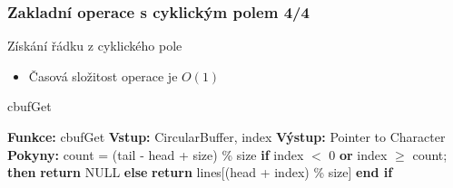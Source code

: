 \documentclass[]{fitthesispresn}
\begin{document}
    \begin{frame}
        \frametitle{Zakladní operace s cyklickým polem 4/4}
        Získání řádku z cyklického pole
        \begin{itemize}
            \item Časová složitost operace je $O(1)$
        \end{itemize}
        \begin{algorithm}[H]
        \caption{cbufGet}
        \label{alg:cbufGet}
        \begin{algorithmic}[1]
            \State \textbf{Funkce:} cbufGet
            \State \textbf{Vstup:} CircularBuffer, index
            \State \textbf{Výstup:} Pointer to Character
            \State \textbf{Pokyny:}
            \State \hspace{\algorithmicindent} count = (tail - head + size) \% size
            \State \hspace{\algorithmicindent} \textbf{if} index $<$ 0 \textbf{or} index $\geq$ count; \textbf{then}
            \State \hspace{\algorithmicindent} \hspace{\algorithmicindent} \textbf{return} NULL
            \State \hspace{\algorithmicindent} \textbf{else}
            \State \hspace{\algorithmicindent} \hspace{\algorithmicindent} \textbf{return} lines[(head + index) \% size]
            \State \hspace{\algorithmicindent} \textbf{end if}
        \end{algorithmic}
        \end{algorithm}
    \end{frame}
\end{document}
